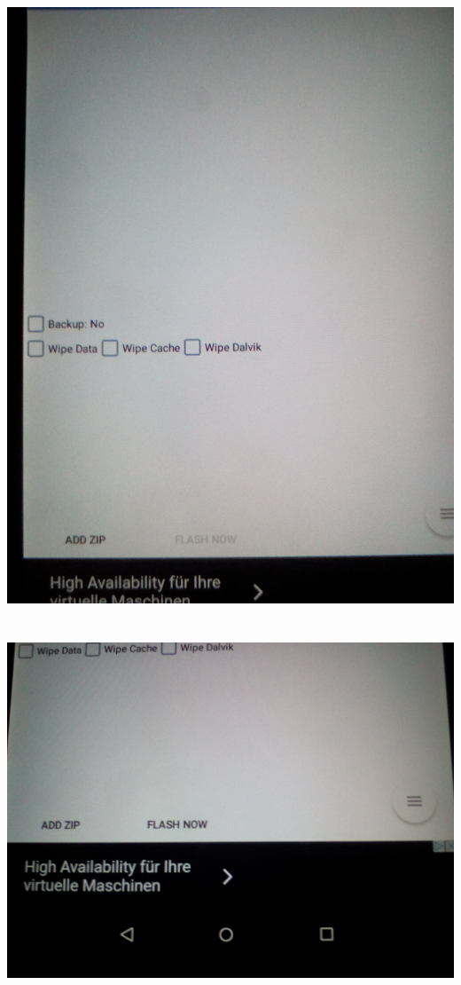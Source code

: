 \documentclass[11pt,a4paper]{article}
\begin{document}
\includegraphics[scale=0.09]{./Image/img12} \\ \\ \\
\includegraphics[scale=0.09]{./Image/img13} \\  \\
\end{document}
